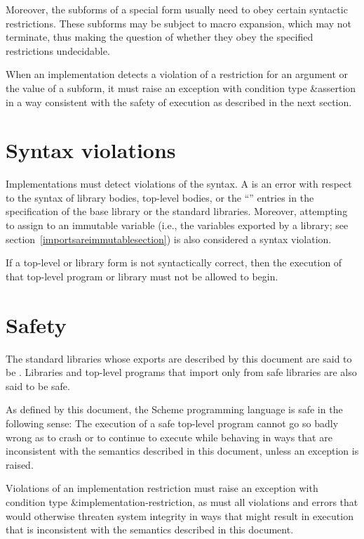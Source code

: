 Moreover, the subforms of a special form usually need to obey certain syntactic
restrictions.  These subforms may be subject to macro expansion, which
may not terminate, thus making the question of whether they obey the
specified restrictions undecidable.

When an implementation detects a violation of a restriction for an
argument or the value of a subform, it must raise an exception with
condition type {\cf\&assertion} in a way consistent with the safety of
execution as described in the next section.

\section{Syntax violations}

Implementations must detect
violations of the syntax.  A  is an error
with respect to the syntax of library bodies, top-level bodies,
or the ``\exprtype'' entries in the
specification of the base library or the standard libraries.
Moreover, attempting to assign to an immutable variable (i.e., the
variables exported by a library; see
section~\ref{importsareimmutablesection}) is also
considered a syntax violation.

If a top-level or library form is not syntactically correct, then the
execution of that top-level program or library must not be allowed to begin.

\section{Safety}
\label{safeunsafemodesection}

The standard libraries whose exports are described by this document
are said to be .  Libraries and top-level
programs that import only from safe libraries are also said to be safe.

As defined by this document, the Scheme programming language
is safe in the following sense:
The execution of a safe top-level program
cannot go so badly wrong as to crash or to continue to
execute while behaving in ways that are
inconsistent with the semantics described in this document,
unless an exception is raised.

Violations of an implementation restriction must raise an
exception with condition type {\cf\&implementation-restriction},
as must all
violations and errors that would otherwise threaten system
integrity in ways that might result in execution that is
inconsistent with the semantics described in this document.

